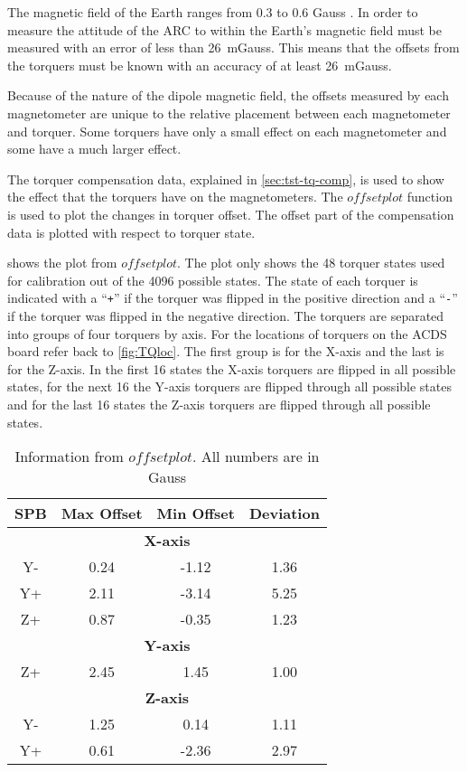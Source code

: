 The magnetic field of the Earth ranges from 0.3 to 0.6 Gauss \cite[pp.~114]{Wertz}. In order to measure the attitude of the \ac{ARC} to within {\textdegree} the Earth's magnetic field must be measured with an error of less than 26~mGauss. This means that the offsets from the torquers must be known with an accuracy of at least 26~mGauss.

Because of the nature of the dipole magnetic field, the offsets measured by each magnetometer are unique to the relative placement between each magnetometer and torquer. Some torquers have only a small effect on each magnetometer and some have a much larger effect. 

The torquer compensation data, explained in \cref{sec:tst-tq-comp}, is used to show the effect that the torquers have on the magnetometers. The \lstMat$offsetplot$ function is used to plot the changes in torquer offset. The offset part of the compensation data is plotted with respect to torquer state.

 shows the plot from \lstMat$offsetplot$. The plot only shows the 48 torquer states used for calibration out of the 4096 possible states. The state of each torquer is indicated with a \enquote{\texttt{+}} if the torquer was flipped in the positive direction and a \enquote{\texttt{-}} if the torquer was flipped in the negative direction. The torquers are separated into groups of four torquers by axis. For the locations of torquers on the \ac{ACDS} board refer back to \cref{fig:TQloc}. The first group is for the X-axis and the last is for the Z-axis. In the first 16 states the X-axis torquers are flipped in all possible states, for the next 16 the Y-axis torquers are flipped through all possible states and for the last 16 states the Z-axis torquers are flipped through all possible states.

 
\begin{table}[!ht]
    \centering
    \caption{Information from \lstMat$offsetplot$. All numbers are in Gauss}
    \label{tab:off-stat}
    \begin{tabular}{|c|c|c|c|}
        \hline
        \acs{SPB}&Max Offset&Min Offset&Deviation\\
        \hline
        \multicolumn{4}{|c|}{\bfseries X-axis}\\
        \hline
        Y-&0.24&-1.12&1.36\\
        \hline
        Y+&2.11&-3.14&5.25\\
        \hline
        Z+&0.87&-0.35&1.23\\
        \hline
        \multicolumn{4}{|c|}{\bfseries Y-axis}\\
        \hline
        Z+&2.45&1.45&1.00\\
        \hline
        \multicolumn{4}{|c|}{\bfseries Z-axis}\\
        \hline
        Y-&1.25&0.14&1.11\\
        \hline
        Y+&0.61&-2.36&2.97\\
        \hline
    \end{tabular}
\end{table}

